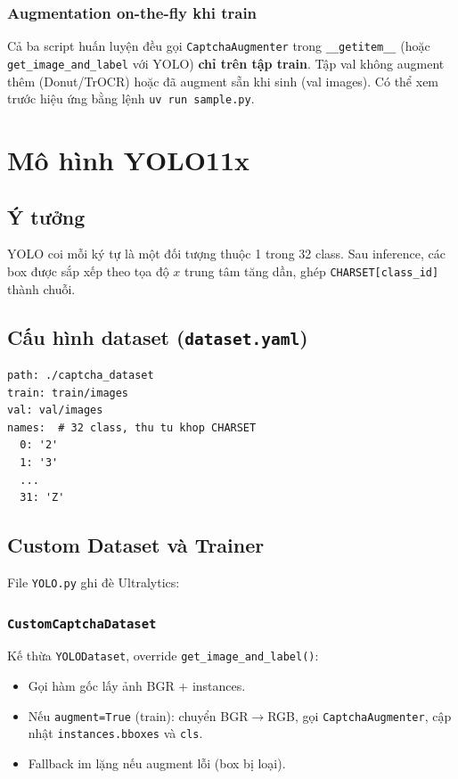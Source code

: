 \documentclass[a4paper,12pt]{report}
\begin{document}
\subsection{Augmentation on-the-fly khi train}
Cả ba script huấn luyện đều gọi \texttt{CaptchaAugmenter} trong \texttt{\_\_getitem\_\_} (hoặc \texttt{get\_image\_and\_label} với YOLO) \textbf{chỉ trên tập train}. Tập val không augment thêm (Donut/TrOCR) hoặc đã augment sẵn khi sinh (val images). Có thể xem trước hiệu ứng bằng lệnh \texttt{uv run sample.py}.

\chapter{Mô hình YOLO11x}

\section{Ý tưởng}
YOLO coi mỗi ký tự là một đối tượng thuộc 1 trong 32 class. Sau inference, các box được sắp xếp theo tọa độ $x$ trung tâm tăng dần, ghép \texttt{CHARSET[class\_id]} thành chuỗi.

\section{Cấu hình dataset (\texttt{dataset.yaml})}
\begin{lstlisting}
path: ./captcha_dataset
train: train/images
val: val/images
names:  # 32 class, thu tu khop CHARSET
  0: '2'
  1: '3'
  ...
  31: 'Z'
\end{lstlisting}

\section{Custom Dataset và Trainer}
File \texttt{YOLO.py} ghi đè Ultralytics:

\subsection{\texttt{CustomCaptchaDataset}}
Kế thừa \texttt{YOLODataset}, override \texttt{get\_image\_and\_label()}:
\begin{itemize}[leftmargin=*]
  \item Gọi hàm gốc lấy ảnh BGR + instances.
  \item Nếu \texttt{augment=True} (train): chuyển BGR$\rightarrow$RGB, gọi \texttt{CaptchaAugmenter}, cập nhật \texttt{instances.bboxes} và \texttt{cls}.
  \item Fallback im lặng nếu augment lỗi (box bị loại).
\end{itemize}
\end{document}
